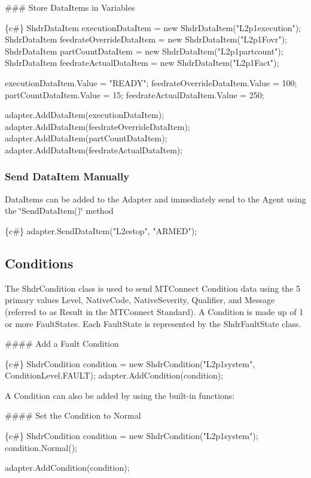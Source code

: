 \#\#\# Store Data\+Items in Variables 
\begin{DoxyCode}
\{c#\}
ShdrDataItem executionDataItem = new ShdrDataItem("L2p1execution");
ShdrDataItem feedrateOverrideDataItem = new ShdrDataItem("L2p1Fovr");
ShdrDataItem partCountDataItem = new ShdrDataItem("L2p1partcount");
ShdrDataItem feedrateActualDataItem = new ShdrDataItem("L2p1Fact");

executionDataItem.Value = "READY";
feedrateOverrideDataItem.Value = 100;
partCountDataItem.Value = 15;
feedrateActualDataItem.Value = 250;

adapter.AddDataItem(executionDataItem);
adapter.AddDataItem(feedrateOverrideDataItem);
adapter.AddDataItem(partCountDataItem);
adapter.AddDataItem(feedrateActualDataItem);
\end{DoxyCode}


\subsubsection*{Send Data\+Item Manually}

Data\+Items can be added to the Adapter and immediately send to the Agent using the \char`\"{}\+Send\+Data\+Item()\char`\"{} method 
\begin{DoxyCode}
\{c#\}
adapter.SendDataItem("L2estop", "ARMED");
\end{DoxyCode}


\subsection*{Conditions}

The Shdr\+Condition class is used to send M\+T\+Connect Condition data using the 5 primary values Level, Native\+Code, Native\+Severity, Qualifier, and Message (referred to as Result in the M\+T\+Connect Standard). A Condition is made up of 1 or more Fault\+States. Each Fault\+State is represented by the Shdr\+Fault\+State class.

\#\#\#\# Add a Fault Condition 
\begin{DoxyCode}
\{c#\}
ShdrCondition condition = new ShdrCondition("L2p1system", ConditionLevel.FAULT);
adapter.AddCondition(condition);
\end{DoxyCode}


A Condition can also be added by using the built-\/in functions\+:

\#\#\#\# Set the Condition to Normal 
\begin{DoxyCode}
\{c#\}
ShdrCondition condition = new ShdrCondition("L2p1system");
condition.Normal();

adapter.AddCondition(condition);
\end{DoxyCode}


